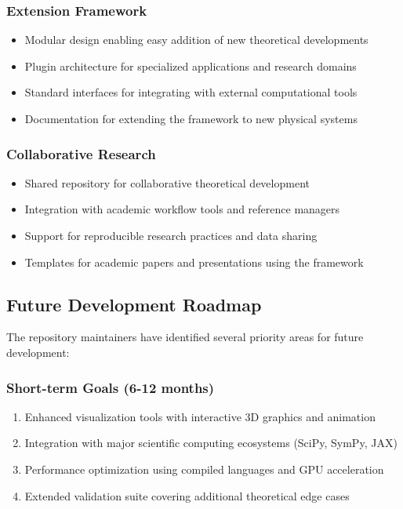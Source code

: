 \subsubsection{Extension Framework}

\begin{itemize}
\item Modular design enabling easy addition of new theoretical developments
\item Plugin architecture for specialized applications and research domains
\item Standard interfaces for integrating with external computational tools
\item Documentation for extending the framework to new physical systems
\end{itemize}

\subsubsection{Collaborative Research}

\begin{itemize}
\item Shared repository for collaborative theoretical development
\item Integration with academic workflow tools and reference managers
\item Support for reproducible research practices and data sharing
\item Templates for academic papers and presentations using the framework
\end{itemize}

\subsection{Future Development Roadmap}
\label{subsec:development_roadmap}

The repository maintainers have identified several priority areas for future development:

\subsubsection{Short-term Goals (6-12 months)}

\begin{enumerate}
\item Enhanced visualization tools with interactive 3D graphics and animation
\item Integration with major scientific computing ecosystems (SciPy, SymPy, JAX)
\item Performance optimization using compiled languages and GPU acceleration
\item Extended validation suite covering additional theoretical edge cases
\end{enumerate}

